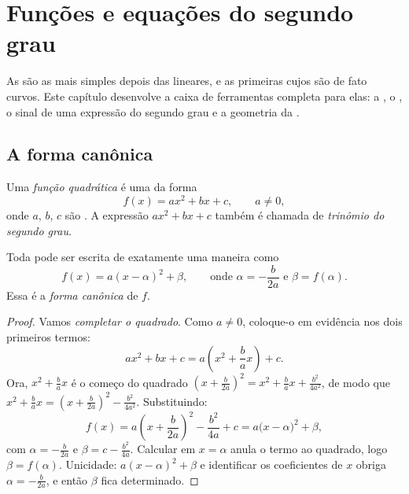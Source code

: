 \chapter{Funções e equações do segundo grau}\label{ch:g11:quad}

As  são as mais simples depois das lineares, e as
primeiras cujos  são de fato curvos. Este capítulo desenvolve a
caixa de ferramentas completa para elas: a , o
, o sinal de uma expressão do segundo grau e a geometria da
.

\section{A forma canônica}

\begin{definition}\label{def:g11:quad:quadratic}
Uma \emph{função quadrática} é uma  da
forma
\[
f(x) = ax^2 + bx + c, \qquad a \neq 0,
\]
onde $a$, $b$, $c$ são . A expressão $ax^2 + bx + c$ também
é chamada de \emph{trinômio do segundo grau}.
\end{definition}

\begin{theorem}\label{thm:g11:quad:canonical}
Toda  pode ser escrita de exatamente uma maneira como
\[
f(x) = a(x - \alpha)^2 + \beta,
\qquad\text{onde } \alpha = -\frac{b}{2a} \text{ e } \beta = f(\alpha).
\]
Essa é a \emph{forma canônica} de $f$.
\end{theorem}

\begin{proof}
Vamos \emph{completar o quadrado}. Como $a \neq 0$, coloque-o em
evidência nos dois primeiros termos:
\[
ax^2 + bx + c = a\left(x^2 + \frac{b}{a}x\right) + c .
\]
Ora, $x^2 + \frac{b}{a}x$ é o começo do quadrado
$\left(x + \frac{b}{2a}\right)^2 = x^2 + \frac ba x + \frac{b^2}{4a^2}$,
de modo que $x^2 + \frac{b}{a}x = \left(x + \frac{b}{2a}\right)^2 -
\frac{b^2}{4a^2}$. Substituindo:
\[
f(x) = a\left(x + \frac{b}{2a}\right)^2 - \frac{b^2}{4a} + c
= a\bigl(x - \alpha\bigr)^2 + \beta,
\]
com $\alpha = -\frac{b}{2a}$ e $\beta = c - \frac{b^2}{4a}$. Calcular em
$x = \alpha$ anula o termo ao quadrado, logo $\beta = f(\alpha)$.
Unicidade:  $a(x-\alpha)^2 + \beta$ e identificar os coeficientes
de $x$ obriga $\alpha = -\frac{b}{2a}$, e então $\beta$ fica determinado.
\end{proof}

